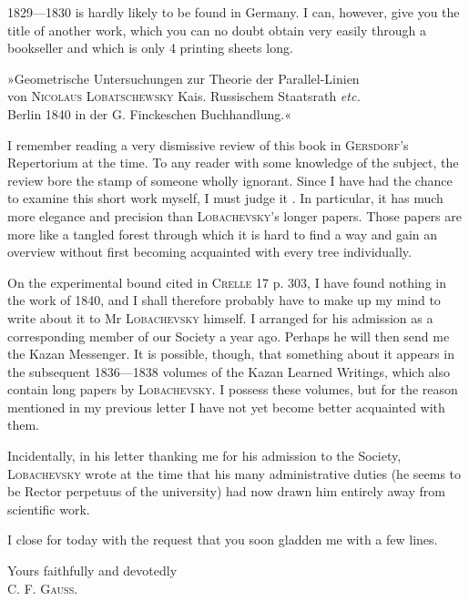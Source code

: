 %
1829---1830 is hardly likely to be found in Germany. I can, however, give you the title of another work, which you can no doubt obtain very easily through a bookseller and which is only 4 printing sheets long.

\begin{center}
»Geometrische Untersuchungen zur Theorie der Parallel-Linien\\
von \textsc{Nicolaus} \textsc{Lobatschewsky} Kais. Russischem Staatsrath \emph{etc.}\\
Berlin 1840 in der G. Finckeschen Buchhandlung.«
\end{center}

I remember reading a very dismissive review of this book in \textsc{Gersdorf}'s Repertorium at the time. To any reader with some knowledge of the subject, the review bore the stamp of someone wholly ignorant. Since I have had the chance to examine this short work myself, I must judge it . In particular, it has much more elegance and precision than \textsc{Lobachevsky}'s longer papers. Those papers are more like a tangled forest through which it is hard to find a way and gain an overview without first becoming acquainted with every tree individually.

On the experimental bound cited in \textsc{Crelle} 17 p. 303, I have found nothing in the work of 1840, and I shall therefore probably have to make up my mind to write about it to Mr \textsc{Lobachevsky} himself. I arranged for his admission as a corresponding member of our Society a year ago. Perhaps he will then send me the Kazan Messenger. It is possible, though, that something about it appears in the subsequent 1836---1838 volumes of the Kazan Learned Writings, which also contain long papers by \textsc{Lobachevsky}. I possess these volumes, but for the reason mentioned in my previous letter I have not yet become better acquainted with them.

Incidentally, in his letter thanking me for his admission to the Society, \textsc{Lobachevsky} wrote at the time that his many administrative duties (he seems to be Rector perpetuus of the university) had now drawn him entirely away from scientific work.

I close for today with the request that you soon gladden me with a few lines.

\begin{flushright}
Yours faithfully and devotedly\\
\textsc{C. F. Gauss}.
\end{flushright}

\par\bigskip
